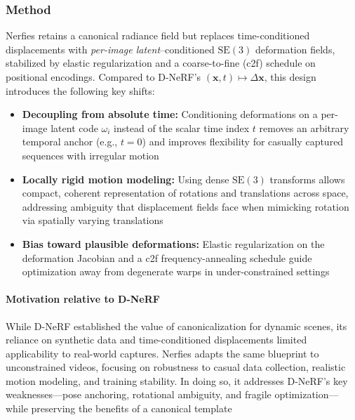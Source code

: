 \begin{enrichment}
\begin{enrichment}
        \subsubsection{Method}
        \label{subsec:chapter23_nerfies_method}
        Nerfies retains a canonical radiance field but replaces time-conditioned displacements with \emph{per-image latent}–conditioned \(\mathrm{SE}(3)\) deformation fields, stabilized by elastic regularization and a coarse-to-fine (c2f) schedule on positional encodings. Compared to D-NeRF’s \( (\mathbf{x},t)\mapsto \Delta\mathbf{x} \), this design introduces the following key shifts:
        \begin{itemize}
            \item \textbf{Decoupling from absolute time:} \; Conditioning deformations on a per-image latent code \(\omega_i\) instead of the scalar time index \(t\) removes an arbitrary temporal anchor (e.g., \(t{=}0\)) and improves flexibility for casually captured sequences with irregular motion
            \item \textbf{Locally rigid motion modeling:} \; Using dense \(\mathrm{SE}(3)\) transforms allows compact, coherent representation of rotations and translations across space, addressing ambiguity that displacement fields face when mimicking rotation via spatially varying translations
            \item \textbf{Bias toward plausible deformations:} \; Elastic regularization on the deformation Jacobian and a c2f frequency-annealing schedule guide optimization away from degenerate warps in under-constrained settings
        \end{itemize}
        
        \paragraph{Motivation relative to D-NeRF}
        While D-NeRF established the value of canonicalization for dynamic scenes, its reliance on synthetic data and time-conditioned displacements limited applicability to real-world captures. Nerfies adapts the same blueprint to unconstrained videos, focusing on robustness to casual data collection, realistic motion modeling, and training stability. In doing so, it addresses D-NeRF’s key weaknesses—pose anchoring, rotational ambiguity, and fragile optimization—while preserving the benefits of a canonical template
        

\end{enrichment}
\end{enrichment}

